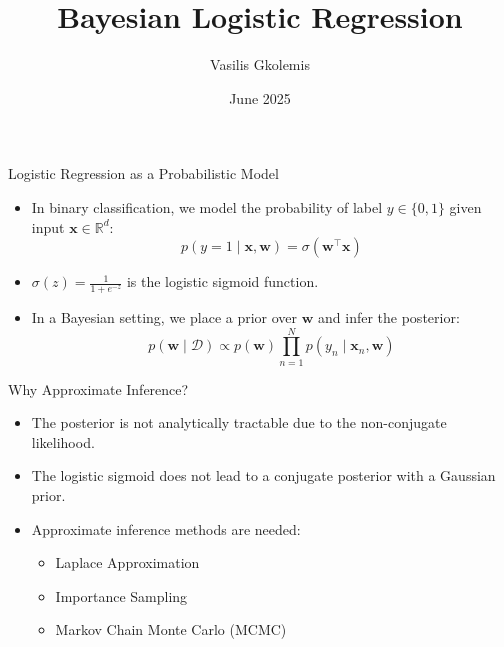 \documentclass{beamer}
\title{Bayesian Logistic Regression}
\author{Vasilis Gkolemis}
\institute{ATHENA RC | HUA}
\date{June 2025}
\begin{document}
\frame{\titlepage}


\begin{frame}{Logistic Regression as a Probabilistic Model}
\begin{itemize}
  \item In binary classification, we model the probability of label $y \in \{0,1\}$ given input $\mathbf{x} \in \mathbb{R}^d$:
  \[
    p(y = 1 \mid \mathbf{x}, \mathbf{w}) = \sigma(\mathbf{w}^\top \mathbf{x})
  \]
  \item $\sigma(z) = \frac{1}{1 + e^{-z}}$ is the logistic sigmoid function.
  \item In a Bayesian setting, we place a prior over $\mathbf{w}$ and infer the posterior:
  \[
    p(\mathbf{w} \mid \mathcal{D}) \propto p(\mathbf{w}) \prod_{n=1}^{N} p(y_n \mid \mathbf{x}_n, \mathbf{w})
  \]
\end{itemize}
\end{frame}

\begin{frame}{Why Approximate Inference?}
\begin{itemize}
  \item The posterior is not analytically tractable due to the non-conjugate likelihood.
  \item The logistic sigmoid does not lead to a conjugate posterior with a Gaussian prior.
  \item Approximate inference methods are needed:
  \begin{itemize}
    \item Laplace Approximation
    \item Importance Sampling
    \item Markov Chain Monte Carlo (MCMC)
  \end{itemize}
\end{itemize}
\end{frame}
\end{document}
